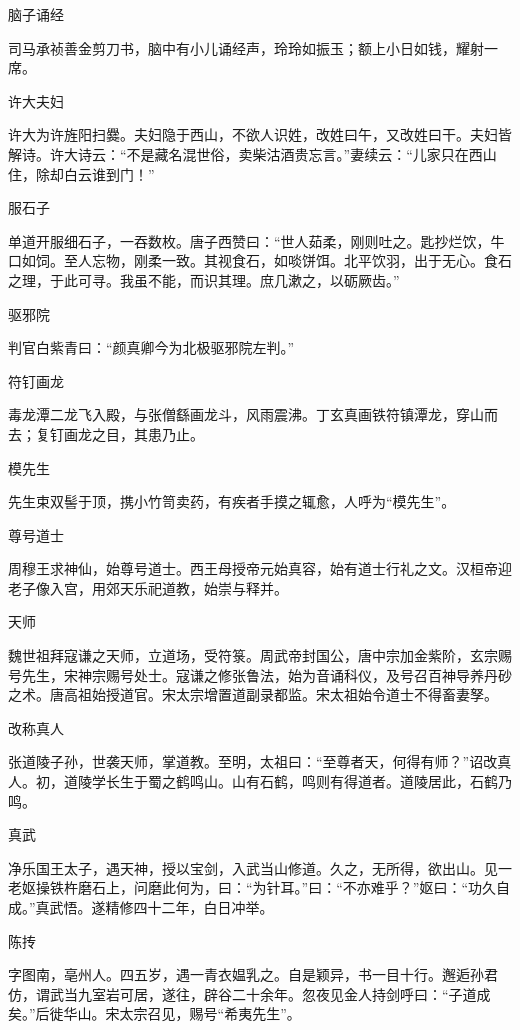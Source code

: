\documentclass[a4paper,12pt,UTF8,twoside]{ctexbook}
\begin{document}
    脑子诵经
    
    司马承祯善金剪刀书，脑中有小儿诵经声，玲玲如振玉；额上小日如钱，耀射一席。
    
    许大夫妇
    
    许大为许旌阳扫爨。夫妇隐于西山，不欲人识姓，改姓曰午，又改姓曰干。夫妇皆解诗。许大诗云：“不是藏名混世俗，卖柴沽酒贵忘言。”妻续云：“儿家只在西山住，除却白云谁到门！”
    
    服石子
    
    单道开服细石子，一吞数枚。唐子西赞曰：“世人茹柔，刚则吐之。匙抄烂饮，牛口如饲。至人忘物，刚柔一致。其视食石，如啖饼饵。北平饮羽，出于无心。食石之理，于此可寻。我虽不能，而识其理。庶几漱之，以砺厥齿。”
    
    驱邪院
    
    判官白紫青曰：“颜真卿今为北极驱邪院左判。”
    
    符钉画龙
    
    毒龙潭二龙飞入殿，与张僧繇画龙斗，风雨震沸。丁玄真画铁符镇潭龙，穿山而去；复钉画龙之目，其患乃止。
    
    模先生
    
    先生束双髻于顶，携小竹笥卖药，有疾者手摸之辄愈，人呼为“模先生”。
    
    尊号道士
    
    周穆王求神仙，始尊号道士。西王母授帝元始真容，始有道士行礼之文。汉桓帝迎老子像入宫，用郊天乐祀道教，始崇与释并。
    
    天师
    
    魏世祖拜寇谦之天师，立道场，受符箓。周武帝封国公，唐中宗加金紫阶，玄宗赐号先生，宋神宗赐号处士。寇谦之修张鲁法，始为音诵科仪，及号召百神导养丹砂之术。唐高祖始授道官。宋太宗增置道副录都监。宋太祖始令道士不得畜妻孥。
    
    改称真人
    
    张道陵子孙，世袭天师，掌道教。至明，太祖曰：“至尊者天，何得有师？”诏改真人。初，道陵学长生于蜀之鹤鸣山。山有石鹤，鸣则有得道者。道陵居此，石鹤乃鸣。
    
    真武
    
    净乐国王太子，遇天神，授以宝剑，入武当山修道。久之，无所得，欲出山。见一老妪操铁杵磨石上，问磨此何为，曰：“为针耳。”曰：“不亦难乎？”妪曰：“功久自成。”真武悟。遂精修四十二年，白日冲举。
    
    陈抟
    
    字图南，亳州人。四五岁，遇一青衣媪乳之。自是颖异，书一目十行。邂逅孙君仿，谓武当九室岩可居，遂往，辟谷二十余年。忽夜见金人持剑呼曰：“子道成矣。”后徙华山。宋太宗召见，赐号“希夷先生”。
    
\end{document}
